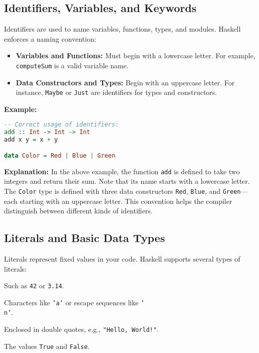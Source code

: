 \documentclass[11pt,a4paper]{article}
\begin{document}
\subsection{Identifiers, Variables, and Keywords}
Identifiers are used to name variables, functions, types, and modules. Haskell enforces a naming convention:
\begin{itemize}[noitemsep]
  \item \textbf{Variables and Functions:} Must begin with a lowercase letter. For example, \texttt{computeSum} is a valid variable name.
  \item \textbf{Data Constructors and Types:} Begin with an uppercase letter. For instance, \texttt{Maybe} or \texttt{Just} are identifiers for types and constructors.
\end{itemize}

\textbf{Example:}
\begin{lstlisting}[language=Haskell]
-- Correct usage of identifiers:
add :: Int -> Int -> Int
add x y = x + y

data Color = Red | Blue | Green
\end{lstlisting}

\textbf{Explanation:}  
In the above example, the function \texttt{add} is defined to take two integers and return their sum. Note that its name starts with a lowercase letter. The \texttt{Color} type is defined with three data constructors \texttt{Red}, \texttt{Blue}, and \texttt{Green}—each starting with an uppercase letter. This convention helps the compiler distinguish between different kinds of identifiers.

\subsection{Literals and Basic Data Types}
Literals represent fixed values in your code. Haskell supports several types of literals:
\begin{description}[noitemsep]
  \item[Numeric Literals:] Such as \texttt{42} or \texttt{3.14}.
  \item[Character Literals:] Characters like \texttt{'a'} or escape sequences like \texttt{'\\n'}.
  \item[String Literals:] Enclosed in double quotes, e.g., \texttt{"Hello, World!"}.
  \item[Boolean Literals:] The values \texttt{True} and \texttt{False}.
\end{description}
\end{document}
